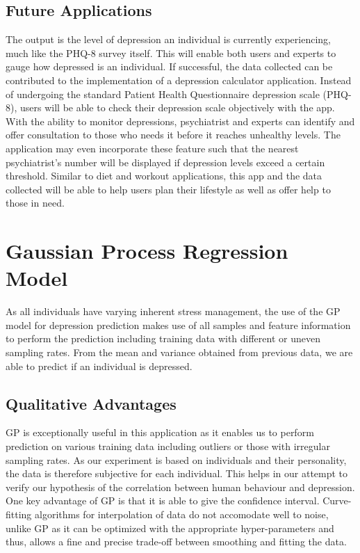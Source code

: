 \documentclass{article}
\begin{document}
	\subsection{Future Applications}
	The output is the level of depression an individual is currently experiencing, much like the PHQ-8 survey itself. 
	This will enable both users and experts to gauge how depressed is an individual. If successful, the data collected can be contributed to the implementation of a depression calculator application. 
	Instead of undergoing the standard Patient Health Questionnaire depression scale (PHQ-8), users will be able to check their depression scale objectively with the app. \\
	With the ability to monitor depressions, psychiatrist and experts can identify and offer consultation to those who needs it before it reaches unhealthy levels. 
	The application may even incorporate these feature such that the nearest psychiatrist's number will be displayed if depression levels exceed a certain threshold. 
	Similar to diet and workout applications, this app and the data collected will be able to help users plan their lifestyle as well as offer help to those in need.
	
	\section{Gaussian Process Regression Model}
	As all individuals have varying inherent stress management, the use of the GP model for depression prediction makes use of all samples and feature information to perform the prediction including training data with different or uneven sampling rates. 
	From the mean and variance obtained from previous data, we are able to predict if an individual is depressed. \\	

	\subsection{Qualitative Advantages}
	 GP is exceptionally useful in this application as it enables us to perform prediction on various training data including outliers or those with irregular sampling rates. 
	As our experiment is based on individuals and their personality, the data is therefore subjective for each individual. This helps in our attempt to verify our hypothesis of the correlation between human behaviour and depression. \\

	One key advantage of GP is that it is able to give the confidence interval. 
	Curve-fitting algorithms for interpolation of data do not accomodate well to noise, unlike GP as it can be optimized with the appropriate hyper-parameters and thus, allows a fine and precise trade-off between smoothing and fitting the data. \\
\end{document}
